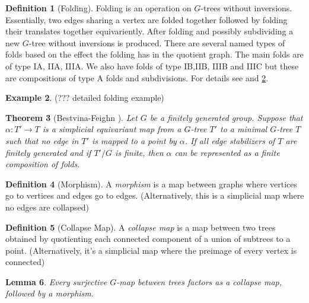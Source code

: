 \documentclass[12pt,parskip=full]{report}
\theoremstyle{plain}
\newtheorem{thm}{Theorem}[section]
\newtheorem{lem}[thm]{Lemma}
\theoremstyle{definition}
\newtheorem{dfn}[thm]{Definition}
\newtheorem{exa}[thm]{Example}
\begin{document}
\begin{dfn}
    [Folding]
    \label{defn:folding}
    Folding is an operation on \(G\)-trees without inversions. Essentially, two edges sharing a vertex are folded together followed by folding their translates together equivariently. After folding and possibly subdividing a new \(G\)-tree without inversions is produced. There are several named types of folds based on the effect the folding has in the quotient graph. The main folds are of type IA, IIA, IIIA. We also have folds of type IB,IIB, IIIB and IIIC but these are compositions of type A folds and subdivisions. For details see \cite{boundingcomplexity} and \ref{exa:folding}.
\end{dfn}

\begin{exa}
\label{exa:folding}
(??? detailed folding example)
\end{exa}

\begin{thm}[Bestvina-Feighn \cite{boundingcomplexity}]
    \label{thm:folds} 
    Let $G$ be a finitely generated group. Suppose that $\alpha: T'\to T$ is a simplicial equivariant map from a $G$-tree $T'$ to a minimal $G$-tree $T$ such that no edge in $T'$ is mapped to a point by $\alpha$. If all edge stabilizers of $T$ are finitely generated and if $T'/G$ is finite, then $\alpha$ can be represented as a finite composition of folds.
\end{thm}

\begin{dfn}
    [Morphism]
    A \emph{morphism} is a map between graphs where vertices go to vertices and edges go to edges. (Alternatively, this is a simplicial map where no edges are collapsed)
\end{dfn}

\begin{dfn}
    [Collapse Map]
    A \emph{collapse map} is a map between two trees obtained by quotienting each connected component of a union of subtrees to a point. (Alternatively, it's a simplicial map where the preimage of every vertex is connected)
\end{dfn}

\begin{lem}
    \label{lem:gmapfactor}
    Every surjective \(G\)-map between trees factors as a collapse map, followed by a morphism.
\end{lem}
\end{document}
